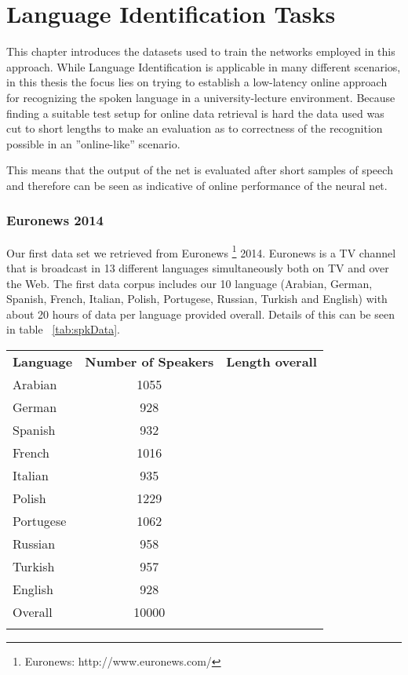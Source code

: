 



\chapter{Language Identification Tasks}
\label{ch:LITasks}
This chapter introduces the datasets used to train the networks employed in this approach. While Language Identification is applicable in many different scenarios, in this thesis the focus lies on trying to establish a low-latency online approach for recognizing the spoken language in a university-lecture environment. Because finding a suitable test setup for online data retrieval is hard the data used was cut to short lengths to make an evaluation as to correctness of the recognition possible in an ''online-like'' scenario. 

This means that the output of the net is evaluated after short samples of speech and therefore can be seen as indicative of online performance of the neural net.

\subsection{Euronews 2014}
\label{sec:LITasks:Euronews}
Our first data set we retrieved from Euronews \footnote{Euronews: http://www.euronews.com/} 2014. Euronews is a TV channel that is broadcast in 13 different languages simultaneously both on TV and over the Web. The first data corpus includes our 10 language (Arabian, German, Spanish, French, Italian, Polish, Portugese, Russian, Turkish and English)  with about 20 hours of data per language provided overall. Details of this can be seen in table ~\ref{tab:spkData}.

\begin{tabular}[h]{| l | c | r | }
	\hline
	\textbf{Language} & \textbf{Number of Speakers} & \textbf{Length overall} \\
	Arabian & 1055 & \\
	German & 928 & \\
	Spanish & 932 & \\
	French & 1016 & \\
	Italian & 935 & \\
	Polish & 1229 & \\
	Portugese & 1062 & \\
	Russian & 958 & \\
	Turkish & 957 & \\
	English & 928 & \\
	\hline
	Overall & 10000 & \\
	\label{tab:spkData}
\end{tabular}

	